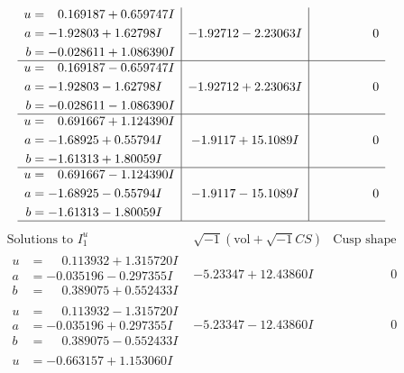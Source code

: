 \documentclass[1p]{elsarticle_modified}
\theoremstyle{definition}
\newcommand{\I}{\sqrt{-1}}
\begin{document}
$$\begin{array}{c|c|c}
\begin{aligned}
u &= \phantom{-}0.169187 + 0.659747 I \\
a &= -1.92803 + 1.62798 I \\
b &= -0.028611 + 1.086390 I\end{aligned}
 & -1.92712 - 2.23063 I & \phantom{-0.000000 } 0 \\ \hline\begin{aligned}
u &= \phantom{-}0.169187 - 0.659747 I \\
a &= -1.92803 - 1.62798 I \\
b &= -0.028611 - 1.086390 I\end{aligned}
 & -1.92712 + 2.23063 I & \phantom{-0.000000 } 0 \\ \hline\begin{aligned}
u &= \phantom{-}0.691667 + 1.124390 I \\
a &= -1.68925 + 0.55794 I \\
b &= -1.61313 + 1.80059 I\end{aligned}
 & -1.9117 + 15.1089 I & \phantom{-0.000000 } 0 \\ \hline\begin{aligned}
u &= \phantom{-}0.691667 - 1.124390 I \\
a &= -1.68925 - 0.55794 I \\
b &= -1.61313 - 1.80059 I\end{aligned}
 & -1.9117 - 15.1089 I & \phantom{-0.000000 } 0\\
 \hline 
 \end{array}$$\newpage$$\begin{array}{c|c|c}  
\text{Solutions to }I^u_{1}& \I (\text{vol} + \sqrt{-1}CS) & \text{Cusp shape}\\
 \hline 
\begin{aligned}
u &= \phantom{-}0.113932 + 1.315720 I \\
a &= -0.035196 - 0.297355 I \\
b &= \phantom{-}0.389075 + 0.552433 I\end{aligned}
 & -5.23347 + 12.43860 I & \phantom{-0.000000 } 0 \\ \hline\begin{aligned}
u &= \phantom{-}0.113932 - 1.315720 I \\
a &= -0.035196 + 0.297355 I \\
b &= \phantom{-}0.389075 - 0.552433 I\end{aligned}
 & -5.23347 - 12.43860 I & \phantom{-0.000000 } 0 \\ \hline\begin{aligned}
u &= -0.663157 + 1.153060 I \\

\end{aligned}
\end{array}$$
\end{document}
